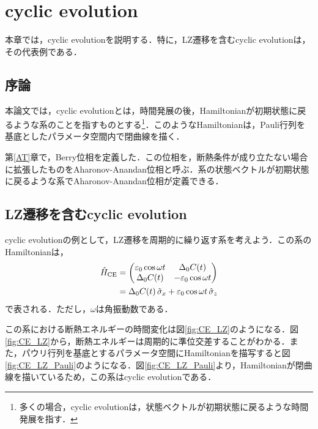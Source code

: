 \chapter{cyclic evolution}\label{CE}
本章では，cyclic evolutionを説明する．特に，LZ遷移を含むcyclic evolutionは，その代表例である．


\section{序論}
本論文では，cyclic evolutionとは，時間発展の後，Hamiltonianが初期状態に戻るような系のことを指すものとする\footnote{多くの場合，cyclic evolutionは，状態ベクトルが初期状態に戻るような時間発展を指す．}．このようなHamiltonianは，Pauli行列を基底としたパラメータ空間内で閉曲線を描く．


第\ref{AT}章で，Berry位相を定義した．この位相を，断熱条件が成り立たない場合に拡張したものをAharonov-Anandan位相と呼ぶ．系の状態ベクトルが初期状態に戻るような系でAharonov-Anandan位相が定義できる\cite{Aharonov}．



\section{LZ遷移を含むcyclic evolution}
cyclic evolutionの例として，LZ遷移を周期的に繰り返す系を考えよう\cite{Kayanuma1993}．この系のHamiltonianは，
\begin{align}
  \Hat{H}_{\mathrm{CE}}
  &=
  \begin{pmatrix}
    \varepsilon_0 \cos \omega t& \Delta_0 C(t)\\
    \Delta_0 C(t) & -\varepsilon_0 \cos \omega t
  \end{pmatrix} \\
  &= \Delta_0 C(t) \, \Hat{\sigma}_x + \varepsilon_0 \cos \omega t \, \Hat{\sigma}_z \label{H_CE_LZ}
\end{align}
で表される．ただし，$\omega$は角振動数である．


この系における断熱エネルギーの時間変化は図\ref{fig:CE_LZ}のようになる．図\ref{fig:CE_LZ}から，断熱エネルギーは周期的に準位交差することがわかる．また，パウリ行列を基底とするパラメータ空間にHamiltonianを描写すると図\ref{fig:CE_LZ_Pauli}のようになる．図\ref{fig:CE_LZ_Pauli}より，Hamiltonianが閉曲線を描いているため，この系はcyclic evolutionである．

